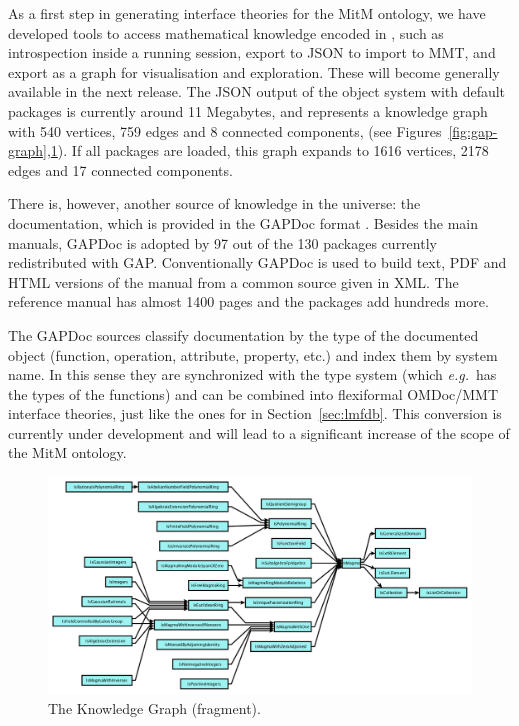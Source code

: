 As a first step in generating interface theories for the MitM ontology, we have developed
tools to access mathematical knowledge encoded in \GAP, such as introspection inside a
running \GAP session, export to JSON to import to MMT, and export as a graph for
visualisation and exploration. These will become generally available in the next \GAP
release. The JSON output of the \GAP object system with default packages is currently
around 11 Megabytes, and represents a knowledge graph with 540 vertices, 759 edges
and 8 connected components, (see Figures~\ref{fig:gap-graph},\ref{fig:gap-ismagma}). If all
packages are loaded, this graph expands to 1616 vertices, 2178 edges and 17 connected
components.

There is, however, another source of knowledge in the \GAP universe: the documentation,
which is provided in the GAPDoc format \cite{gapdoc}. Besides the main manuals, GAPDoc
is adopted by 97 out of the 130 packages currently redistributed with
GAP. Conventionally GAPDoc is used to build text, PDF and HTML versions of the manual
from a common source given in XML. The reference manual has almost 1400 pages and the
packages add hundreds more.

The GAPDoc sources classify documentation by the type of the documented object (function,
operation, attribute, property, etc.) and index them by system name. In this sense they
are synchronized with the type system (which \emph{e.g.}\ has the types of the functions) and can
be combined into flexiformal OMDoc/MMT interface theories, just like the ones for \LMFDB
in Section~\ref{sec:lmfdb}. This conversion is currently under development and will lead
to a significant increase of the scope of the MitM ontology. 

\begin{figure}[ht]\centering
  \includegraphics[natwidth=1289bp,natheight=661bp,width=\textwidth]{gap-ismagma.pdf}
  \caption{The \GAP Knowledge Graph (fragment).\label{fig:gap-ismagma}}
\end{figure}

